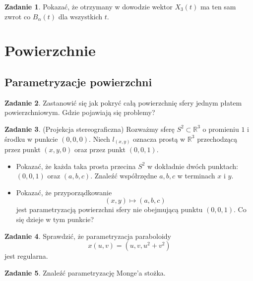 \documentclass[a4paper,11pt]{article}
\theoremstyle{definition}\newtheorem{exercise}{Zadanie}
\theoremstyle{definition}\newtheorem{remark}{Uwaga}
\begin{document}
\begin{exercise}
Pokazać, że otrzymany w dowodzie wektor $X_3(t)$ ma ten sam zwrot co 
$B_\alpha(t)$ dla wszystkich $t$.
\end{exercise}



\section{Powierzchnie}

\subsection{Parametryzacje powierzchni}
\begin{exercise}
Zastanowić się jak pokryć całą powierzchnię sfery jednym płatem 
powierzchniowym. Gdzie pojawiają się problemy?
\end{exercise}

\begin{exercise}(Projekcja stereograficzna)
 Rozważmy sferę $S^2\subset \mathbb{R}^3$ o promieniu $1$ i środku w punkcie 
$(0,0,0)$. Niech 
$l_{(x,y)}$ oznacza prostą w $\mathbb{R}^3$ przechodzącą przez punkt $(x,y,0)$ 
oraz przez punkt $(0,0,1)$. 
\begin{itemize}
 \item Pokazać, że każda taka prosta przecina $S^2$ w dokładnie dw\'och 
punktach: $(0,0,1)$ oraz $(a,b,c)$. Znaleźć wsp\'ołrzędne $a,b,c$ w terminach 
$x$ i $y$.
\item Pokazać, że przyporządkowanie
\[(x,y)\mapsto (a,b,c)\]
jest parametryzacją powierzchni sfery nie obejmującą punktu $(0,0,1)$. Co się 
dzieje w tym punkcie?
\end{itemize}
\end{exercise}


\begin{exercise}
Sprawdzić, że parametryzacja paraboloidy
\[x(u,v)=\left(u,v,u^2+v^2\right)\] jest regularna.
\end{exercise}

\begin{exercise}
Znaleźć parametryzację Monge'a stożka. 
\end{exercise}
\end{document}
